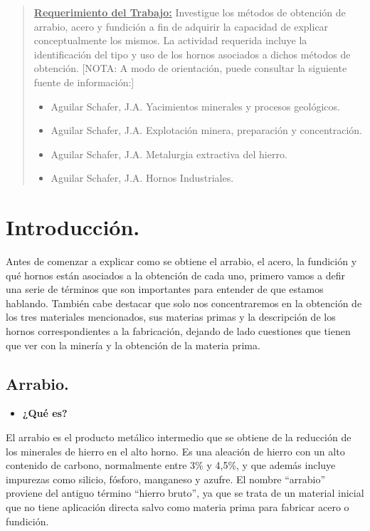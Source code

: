 \documentclass[12pt,a4paper]{article}
\begin{document}

\tableofcontents

\begin{abstract}
    \underline{\textbf{Requerimiento del Trabajo:}} Investigue los métodos de obtención de arrabio, acero y fundición a fin de adquirir la capacidad de explicar conceptualmente los mismos. La actividad requerida incluye la identificación del tipo y uso de los hornos asociados a dichos métodos de obtención. [NOTA: A modo de orientación, puede consultar la siguiente fuente de información:]
    \begin{itemize}
        \item Aguilar Schafer, J.A. Yacimientos minerales y procesos geológicos.
        \item Aguilar Schafer, J.A. Explotación minera, preparación y concentración.
        \item Aguilar Schafer, J.A. Metalurgia extractiva del hierro.
        \item Aguilar Schafer, J.A. Hornos Industriales.
    \end{itemize}
\end{abstract}

\section{Introducción.}
Antes de comenzar a explicar como se obtiene el arrabio, el acero, la fundición y qué hornos están asociados a la obtención de cada uno, primero vamos a defir una serie de términos que son importantes para entender de que estamos hablando. También cabe destacar que solo nos concentraremos en la obtención de los tres materiales mencionados, sus materias primas y la descripción de los hornos correspondientes a la fabricación, dejando de lado cuestiones que tienen que ver con la minería y la obtención de la materia prima.

\subsection{Arrabio.}
\begin{itemize}
    \item \textbf{¿Qué es?}
\end{itemize}

El arrabio es el producto metálico intermedio que se obtiene de la reducción de los minerales de hierro en el alto horno. Es una aleación de hierro con un alto contenido de carbono, normalmente entre 3\% y 4,5\%, y que además incluye impurezas como silicio, fósforo, manganeso y azufre. El nombre “arrabio” proviene del antiguo término “hierro bruto”, ya que se trata de un material inicial que no tiene aplicación directa salvo como materia prima para fabricar acero o fundición.
\end{document}
